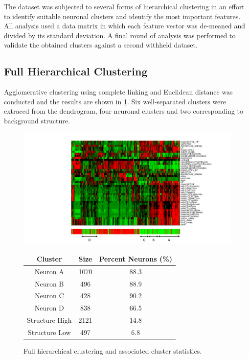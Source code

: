 \documentclass[10pt]{article}
\begin{document}
The dataset was subjected to several forms of hierarchical clustering in an effort to identify suitable neuronal clusters and identify the most important features. 
All analysis used a data matrix in which each feature vector was de-meaned and divided by its standard deviation.
A final round of analysis was performed to validate the obtained clusters against a second withheld dataset.

\subsection{Full Hierarchical Clustering}

Agglomerative clustering using complete linking and Euclidean distance was conducted and the results are shown in \cref{fig:fullhierarchical}.
Six well-separated clusters were extraced from the dendrogram, four neuronal clusters and two corresponding to background structure.

\begin{figure}[h]
    \centering

    \hspace{-1cm}
    \begin{minipage}{0.6\textwidth}
      \centering
      \includegraphics[width=\textwidth]{figs/fig7_cropped.pdf}
    \end{minipage}
    \hspace{-1cm}
    \begin{minipage}{0.45\textwidth}
      \centering
      \footnotesize
      \begin{tabular}{cSS}
        \toprule
        Cluster & {Size} & {Percent Neurons (\%)} \\
        \midrule
        Neuron A & 1070 & 88.3 \\
        Neuron B &  496 & 88.9 \\
        Neuron C &  428 & 90.2 \\
        Neuron D &  838 & 66.5 \\
        Structure High & 2121 & 14.8 \\
        Structure Low &  497 &  6.8 \\
        \bottomrule
      \end{tabular}
    \end{minipage}
    \caption{\footnotesize Full hierarchical clustering and associated cluster statistics.}
    \label{fig:fullhierarchical}
\end{figure}
\end{document}
